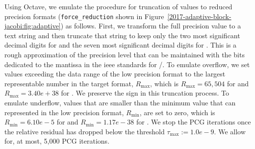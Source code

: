 Using Octave, we emulate the procedure for truncation of \fpd values to reduced
precision \linebreak formats (\texttt{force\_reduction} shown in
Figure~\ref{2017-adaptive-block-jacobi:fig:adaptive})
as follows. First, we transform the full precision value to a text
string and then truncate that string to keep only the two most significant 
decimal digits for \fph and the seven most significant decimal digits for \fps.
This is a rough approximation of the precision level that can be maintained 
with the bits dedicated to the mantissa in the {\sc ieee} standards for 
\fph/\fps. 
To emulate overflow, we set values
exceeding the data range of the low precision format to the largest
representable number in the target format, $R_{\max}$, which is 
$R_{\max}=65,504$ for \fph 
and $R_{\max}=3.40e+38$ for \fps. We preserve the sign in this truncation
process. To emulate underflow, values  that are smaller than the
minimum value that can represented in the low precision format, $R_{\min}$, 
are set to zero, which is $R_{\min}=6.10e-5$ for \fph and $R_{\min}=1.17e-38$ 
for \fps.
We stop the PCG iterations once the relative residual has dropped below the
threshold $\tau_{\max}:=1.0e-9$. We allow for, at most, 5,000 PCG iterations.


